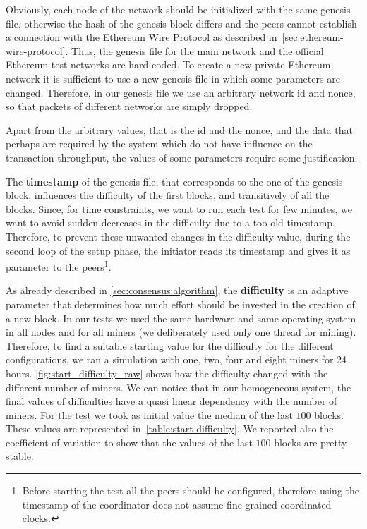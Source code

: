 Obviously, each node of the network should be initialized with the same genesis
file, otherwise the hash of the genesis block differs and the peers cannot
establish a connection with the Ethereum Wire Protocol as described
in~\autoref{sec:ethereum-wire-protocol}. Thus, the genesis file for the main
network and the official Ethereum test networks are hard-coded. To create a new
private Ethereum network it is sufficient to use a new genesis file in which
some parameters are changed. Therefore, in our genesis file we use an arbitrary
network id and nonce, so that packets of different networks are simply dropped.

Apart from the arbitrary values, that is the id and the nonce, and the data that
perhaps are required by the system which do not have influence on the
transaction throughput, the values of some parameters require some
justification.

The \textbf{timestamp} of the genesis file, that corresponds to the one of the
genesis block, influences the difficulty of the first blocks, and transitively
of all the blocks. Since, for time constraints, we want to run each test for few
minutes, we want to avoid sudden decreases in the difficulty due to a too old
timestamp. Therefore, to prevent these unwanted changes in the difficulty value,
during the second loop of the setup phase, the initiator reads its timestamp and
gives it as parameter to the peers\footnote{Before starting the test all the
peers should be configured, therefore using the timestamp of the coordinator
does not assume fine-grained coordinated clocks.}.

As already described in \autoref{sec:consensus:algorithm}, the
\textbf{difficulty} is an adaptive parameter that determines how much effort
should be invested in the creation of a new block. In our tests we used the same
hardware and same operating system in all nodes and for all miners (we
deliberately used only one thread for mining). Therefore, to find a suitable
starting value for the difficulty for the different configurations, we ran a
simulation with one, two, four and eight miners for 24 hours.
\autoref{fig:start_difficulty_raw} shows how the difficulty changed with the
different number of miners. We can notice that in our homogeneous system, the
final values of difficulties have a quasi linear dependency with the number of
miners. For the test we took as initial value the median of the last $100$
blocks. These values are represented in~\autoref{table:start-difficulty}. We
reported also the coefficient of variation to show that the values of the last
$100$ blocks are pretty stable.

